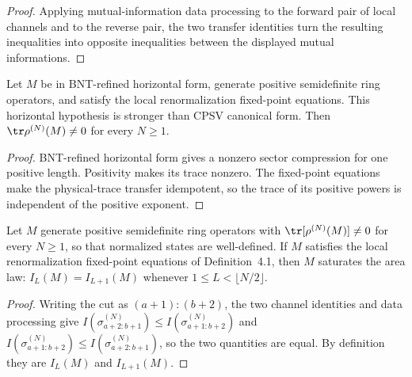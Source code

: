 \begin{proof}\leanok
    Applying mutual-information data processing to the forward pair of local
    channels and to the reverse pair, the two transfer identities turn the
    resulting inequalities into opposite inequalities between the displayed
    mutual informations.
\end{proof}

\begin{lemma}
    \label{lem:mpdo_rfp_positive_length_trace_nonzero}
    \leanok
    Let $M$ be in BNT-refined horizontal form, generate positive
    semidefinite ring operators, and satisfy the local renormalization
    fixed-point equations. This horizontal hypothesis is stronger than
    CPSV canonical form.
    Then $\tr\rho^{(N)}(M)\neq0$ for every $N\geq1$.
\end{lemma}

\begin{proof}\leanok
    BNT-refined horizontal form gives a nonzero sector compression
    for one positive length. Positivity makes its trace nonzero. The fixed-point
    equations make the physical-trace transfer idempotent, so the trace of its
    positive powers is independent of the positive exponent.
\end{proof}

\begin{lemma}
    \label{thm:mpdo_rfp_implies_sal}
    \leanok
    Let $M$ generate positive semidefinite ring operators with
    $\tr[\rho^{(N)}(M)]\neq0$ for every $N\geq1$, so that normalized states are
    well-defined. If $M$ satisfies the local renormalization fixed-point
    equations of Definition~4.1, then $M$ saturates the area law:
    $I_L(M)=I_{L+1}(M)$ whenever
    $1\leq L<\lfloor N/2\rfloor$.
\end{lemma}

\begin{proof}\leanok
    Writing the cut as $(a+1):(b+2)$, the two channel identities and data
    processing give
    $I(\sigma^{(N)}_{a+2:b+1})\leq I(\sigma^{(N)}_{a+1:b+2})$ and
    $I(\sigma^{(N)}_{a+1:b+2})\leq I(\sigma^{(N)}_{a+2:b+1})$, so the two
    quantities are equal. By definition they are $I_L(M)$ and
    $I_{L+1}(M)$.
\end{proof}

